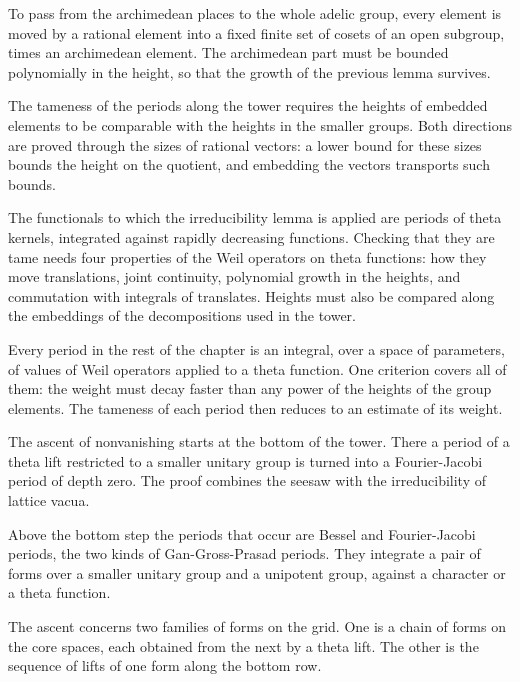 To pass from the archimedean places to the whole adelic group, every element is
moved by a rational element into a fixed finite set of cosets of an open
subgroup, times an archimedean element. The archimedean part must be bounded
polynomially in the height, so that the growth of the previous lemma survives.

The tameness of the periods along the tower requires the heights of embedded
elements to be comparable with the heights in the smaller groups. Both
directions are proved through the sizes of rational vectors: a lower bound for
these sizes bounds the height on the quotient, and embedding the vectors
transports such bounds.

The functionals to which the irreducibility lemma is applied are periods of
theta kernels, integrated against rapidly decreasing functions. Checking that
they are tame needs four properties of the Weil operators on theta functions:
how they move translations, joint continuity, polynomial growth in the
heights, and commutation with integrals of translates. Heights must also be
compared along the embeddings of the decompositions used in the tower.

Every period in the rest of the chapter is an integral, over a space of
parameters, of values of Weil operators applied to a theta function. One
criterion covers all of them: the weight must decay faster than any power of
the heights of the group elements. The tameness of each period then reduces to
an estimate of its weight.

The ascent of nonvanishing starts at the bottom of the tower. There a period
of a theta lift restricted to a smaller unitary group is turned into a
Fourier-Jacobi period of depth zero. The proof combines the seesaw with the
irreducibility of lattice vacua.

Above the bottom step the periods that occur are Bessel and Fourier-Jacobi
periods, the two kinds of Gan-Gross-Prasad periods. They integrate a pair of
forms over a smaller unitary group and a unipotent group, against a character
or a theta function.

The ascent concerns two families of forms on the grid. One is a chain of forms
on the core spaces, each obtained from the next by a theta lift. The other is
the sequence of lifts of one form along the bottom row.

